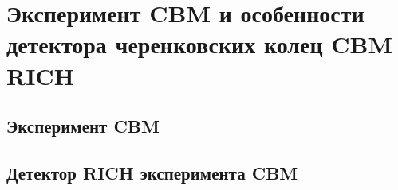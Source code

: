 \chapter{Эксперимент CBM и особенности детектора черенковских колец CBM RICH}\label{sec:secCbm}

\section{Эксперимент CBM}




\section{Детектор RICH эксперимента CBM}




